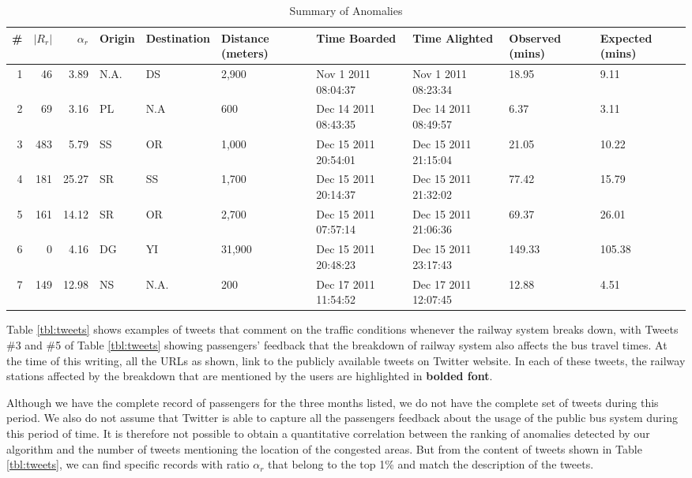 \documentclass[conference]{IEEEtran.1.8}
\begin{document}
\begin{table}[htb]
	\centering
	\caption{Summary of Anomalies}
	\label{tbl:anomalies}
	\begin{tabular}{|r|r|r|p{2.3cm}|p{2.3cm}|p{1.2cm}|p{1.6cm}|p{1.6cm}|p{1.4cm}|p{1.4cm}|}
		\hline
		\# & $|R_r|$ & $\alpha_r$ & Origin & Destination & Distance (meters) & Time Boarded & Time Alighted & Observed (mins) & Expected (mins) \\
		\hline
		1 & 46 & 3.89 & N.A. & DS & 2,900 & Nov 1 2011 08:04:37 & Nov 1 2011 08:23:34 & 18.95 & 9.11 \\
		\hline
		2 & 69 & 3.16 & PL & N.A & 600 & Dec 14 2011 08:43:35 & Dec 14 2011 08:49:57 &6.37 & 3.11\\
		\hline
		3 & 483 & 5.79 & SS & OR & 1,000 & Dec 15 2011 20:54:01 & Dec 15 2011 21:15:04 & 21.05 & 10.22 \\
		\hline
		4 & 181 & 25.27 & SR & SS & 1,700 & Dec 15 2011 20:14:37 & Dec 15 2011 21:32:02 & 77.42 & 15.79 \\
		\hline
		5 & 161 & 14.12 & SR & OR & 2,700 & Dec 15 2011 07:57:14 & Dec 15 2011 21:06:36 & 69.37 & 26.01 \\
		\hline
		6 & 0 & 4.16 & DG & YI & 31,900 & Dec 15 2011 20:48:23 & Dec 15 2011 23:17:43 & 149.33 & 105.38 \\
		\hline
		7 & 149 & 12.98 & NS & N.A. & 200 & Dec 17 2011 11:54:52 & Dec 17 2011 12:07:45 & 12.88 & 4.51 \\
		\hline
	\end{tabular}
\end{table}

Table \ref{tbl:tweets} shows examples of tweets that comment on the traffic conditions whenever the railway system breaks down, with Tweets \#3 and \#5 of Table \ref{tbl:tweets} showing passengers' feedback that the breakdown of railway system also affects the bus travel times. At the time of this writing, all the URLs as shown, link to the publicly available tweets on Twitter website. In each of these tweets, the railway stations affected by the breakdown that are mentioned by the users are highlighted in \textbf{bolded font}.

Although we have the complete record of passengers for the three months listed, we do not have the complete set of tweets during this period. We also do not assume that Twitter is able to capture all the passengers feedback about the usage of the public bus system during this period of time. It is therefore not possible to obtain a quantitative correlation between the ranking of anomalies detected by our algorithm and the number of tweets mentioning the location of the congested areas. But from the content of tweets shown in Table \ref{tbl:tweets}, we can find specific records with ratio $\alpha_r$ that belong to the top 1\% and match the description of the tweets.
\end{document}
